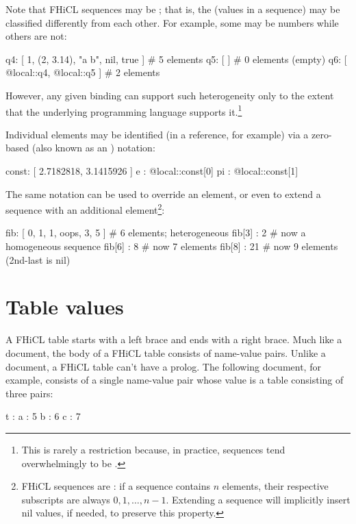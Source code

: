 \documentclass[draftmode,draftwater]{memarticle}
\newcommand{\fhicl}%
 {FHiCL\xspace}
\begin{document}
Note that \fhicl sequences
may be ;
that is,
the  (values in a sequence)
may be classified differently from each other.
For example,
some may be numbers while others are not:
\Needspace{0.50in}
\begin{fcllisting}[texcl,escapechar=`]
q4: [ 1, (2, 3.14), "a b", nil, true ]  # 5 elements
q5: [ ]                                 # 0 elements (empty)
q6: [ @local::q4, @local::q5 ]          # 2 elements
\end{fcllisting}
However, any given binding
can support such heterogeneity
only to the extent
that the underlying programming language supports it.\footnote{%
  This is rarely a restriction
  because, in practice,
  sequences tend overwhelmingly to be .%
}

Individual elements may be identified
(in a reference, for example)
via a zero-based  (also known as an ) notation:
\Needspace{0.50in}
\begin{fcllisting}[texcl,escapechar=`]
const: [ 2.7182818, 3.1415926 ]
e    : @local::const[0]
pi   : @local::const[1]
\end{fcllisting}
The same notation can be used to override an element,
or even to extend a sequence with an additional element\footnote{%
  \fhicl sequences are :
  if a sequence contains $n$ elements,
  their respective subscripts are always $0, 1, \ldots, n-1$.
  Extending a sequence will implicitly insert
  nil values, if needed, to preserve this property.
}:
\Needspace{0.50in}
\begin{fcllisting}[texcl,escapechar=`]
fib: [ 0, 1, 1, oops, 3, 5 ]  # 6 elements; heterogeneous
fib[3] : 2                    # now a homogeneous sequence
fib[6] : 8                    # now 7 elements
fib[8] : 21                   # now 9 elements (2nd-last is nil)
\end{fcllisting}

\section{Table values}

A \fhicl table starts with a left brace
and ends with a right brace.
Much like a document,
the body of a \fhicl table
consists of name-value pairs.
Unlike a document,
a \fhicl table can't have a prolog.
The following document,
for example,
consists of a single name-value pair
whose value is a table consisting of three pairs:
\Needspace{0.67in}
\begin{fcllisting}[texcl,escapechar=`]
t : {  a : 5
       b : 6
       c : 7
    }
\end{fcllisting}
\end{document}
